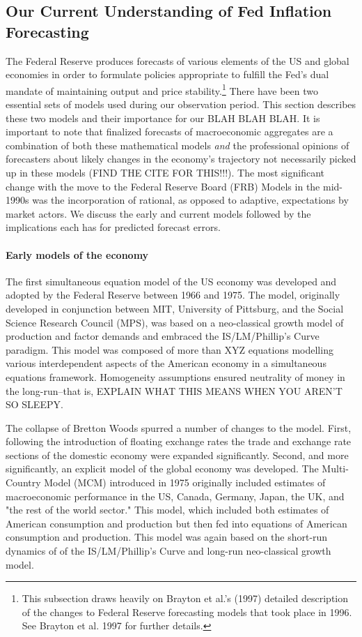 \documentclass[a4paper]{article}\usepackage{graphicx, color}
\begin{document}

\subsection{Our Current Understanding of Fed Inflation Forecasting}

The Federal Reserve produces forecasts of various elements of the US and global economies in order to formulate policies appropriate to fulfill the Fed's dual mandate of maintaining output and price stability.\footnote{This subsection draws heavily on Brayton et al.'s\nocite{Brayton1997} (1997) detailed description of the changes to Federal Reserve forecasting models that took place in 1996. See Brayton et al. 1997 for further details.} There have been two essential sets of models used during our observation period. This section describes these two models and their importance for our BLAH BLAH BLAH. It is important to note that finalized forecasts of macroeconomic aggregates are a combination of both these mathematical models \emph{and} the professional opinions of forecasters about likely changes in the economy's trajectory not necessarily picked up in these models (FIND THE CITE FOR THIS!!!). The most significant change with the move to the Federal Reserve Board (FRB) Models in the mid-1990s was the incorporation of rational, as opposed to adaptive, expectations by market actors. We discuss the early and current models followed by the implications each has for predicted forecast errors.

\paragraph{Early models of the economy}
The first simultaneous equation model of the US economy was developed and adopted by the Federal Reserve between 1966 and 1975. The model, originally developed in conjunction between MIT, University of Pittsburg, and the Social Science Research Council (MPS), was based on a neo-classical growth model of production and factor demands and embraced the IS/LM/Phillip's Curve paradigm. This model was composed of more than XYZ equations modelling various interdependent aspects of the American economy in a simultaneous equations framework. Homogeneity assumptions ensured neutrality of money in the long-run--that is, EXPLAIN WHAT THIS MEANS WHEN YOU AREN'T SO SLEEPY.

The collapse of Bretton Woods spurred a number of changes to the model. First, following the introduction of floating exchange rates the trade and exchange rate sections of the domestic economy were expanded significantly. Second, and more significantly, an explicit model of the global economy was developed. The Multi-Country Model (MCM) introduced in 1975 originally included estimates of macroeconomic performance in the US, Canada, Germany, Japan, the UK, and "the rest of the world sector." This model, which included both estimates of American consumption and production but then fed into equations of American consumption and production. This model was again based on the short-run dynamics of of the IS/LM/Phillip's Curve and long-run neo-classical growth model.
\end{document}
